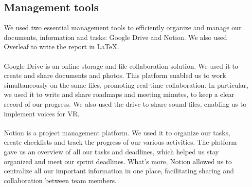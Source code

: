 \newpage
\subsection{Management tools}
We used two essential management tools to efficiently organize and manage our documents, information and tasks: Google Drive and Notion. We also used Overleaf to write the report in LaTeX.\\
\\
Google Drive is an online storage and file collaboration solution. We used it to create and share documents and photos. This platform enabled us to work simultaneously on the same files, promoting real-time collaboration. In particular, we used it to write and share roadmaps and meeting minutes, to keep a clear record of our progress. We also used the drive to share sound files, enabling us to implement voices for VR. \\
\\
Notion is a project management platform. We used it to organize our tasks, create checklists and track the progress of our various activities. The platform gave us an overview of all our tasks and deadlines, which helped us stay organized and meet our sprint deadlines. What's more, Notion allowed us to centralize all our important information in one place, facilitating sharing and collaboration between team members.\\